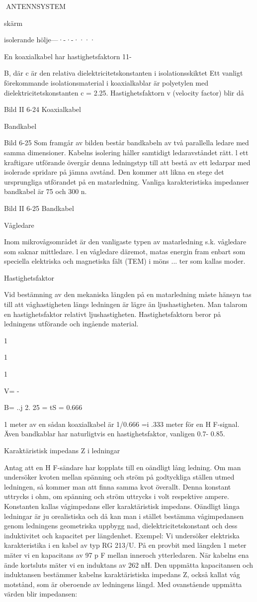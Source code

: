ANTENNSYSTEM

skärm

isolerande hölje---·-·-····

En koaxialkabel har hastighetsfaktorn
11-{B, där c är den relativa dielektricitetskonstanten i isolationsskiktet Ett vanligt förekommande isolationsmaterial i koaxialkablar är polyetylen med dielektricitetskonstanten c = 2.25.
Hastighetsfaktorn v (velocity factor) blir
då

Bild II 6-24 Koaxialkabel

Bandkabel

Bild 6-25
Som framgår av bilden består bandkabeln
av två parallella ledare med samma dimensioner. Kabelns isolering håller samtidigt
ledaravståndet rätt. l ett kraftigare utförande
övergår denna ledningstyp till att bestå av
ett ledarpar med isolerade spridare på jämna
avstånd. Den kommer att likna en stege det ursprungliga utförandet på en matarledning.
Vanliga karakteristiska impedanser
bandkabel är 75 och 300 n.

Bild II 6-25 Bandkabel

Vågledare

Inom mikrovågsområdet är den vanligaste
typen av matarledning s.k. vågledare som
saknar mittledare. l en vågledare däremot,
matas energin fram enbart som speciella
elektriska och magnetiska fält (TEM) i möns ...
ter som kallas moder.

Hastighetsfaktor

Vid bestämning av den mekaniska längden
på en matarledning måste hänsyn tas till att
våghastigheten längs ledningen är lägre än
ljushastigheten. Man talarom en hastighetsfaktor relativt ljushastigheten. Hastighetsfaktorn beror på ledningens utförande och
ingående material.

1

1

1

V= -{B= ..j 2. 25 = tS = 0.666

1 meter av en sådan koaxialkabel är
1/0.666 =i .333 meter för en H F-signal.
Även bandkablar har naturligtvis en
hastighetsfaktor, vanligen 0.7- 0.85.

Karaktäristisk impedans Z i ledningar

Antag att en H F-sändare har kopplats till en
oändligt lång ledning. Om man undersöker
kvoten mellan spänning och ström på godtyckliga ställen utmed ledningen, så kommer man att finna samma kvot överallt.
Denna konstant uttrycks i ohm, om spänning och ström uttrycks i volt respektive
ampere. Konstanten kallas vågimpedans
eller karaktäristisk impedans.
Oändligt långa ledningar är ju orealistiska och då kan man i stället bestämma vågimpedansen genom ledningens geometriska uppbygg nad, dielektricitetskonstant
och dess induktivitet och kapacitet per längdenhet.
Exempel:
Vi undersöker elektriska karakteristika i
en kabel av typ RG 213/U.
På en provbit med längden 1 meter mäter vi en kapacitans av 97 p F mellan inneroch ytterledaren. När kabelns ena ände
kortsluts mäter vi en induktans av 262 nH.
Den uppmätta kapacitansen och induktansen bestämmer kabelns karaktäristiska
impedans Z, också kallat våg motstånd, som
är oberoende av ledningens längd.
Med ovanstående uppmätta värden blir
impedansen:

}}
